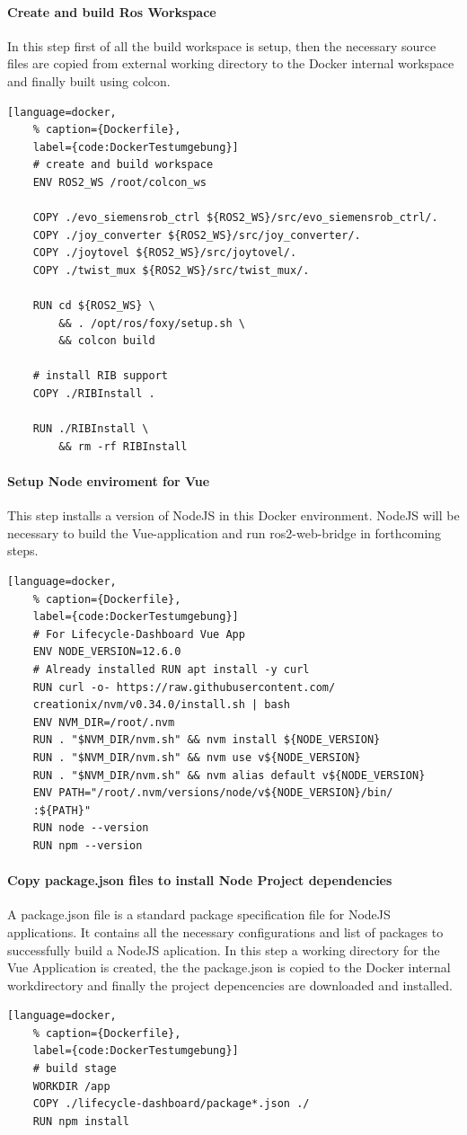\paragraph*{Create and build Ros Workspace} In this step first of all the build workspace is setup, then the necessary source files are copied from external working directory to the Docker internal workspace and finally built using colcon.
\begin{lstlisting}[language=docker,
	% caption={Dockerfile}, 
	label={code:DockerTestumgebung}]
	# create and build workspace
	ENV ROS2_WS /root/colcon_ws
		
	COPY ./evo_siemensrob_ctrl ${ROS2_WS}/src/evo_siemensrob_ctrl/.
	COPY ./joy_converter ${ROS2_WS}/src/joy_converter/.
	COPY ./joytovel ${ROS2_WS}/src/joytovel/.
	COPY ./twist_mux ${ROS2_WS}/src/twist_mux/.

	RUN cd ${ROS2_WS} \
		&& . /opt/ros/foxy/setup.sh \
		&& colcon build
		
	# install RIB support
	COPY ./RIBInstall .

	RUN ./RIBInstall \
		&& rm -rf RIBInstall
\end{lstlisting}

\paragraph{Setup Node enviroment for Vue} This step installs a version of NodeJS in this Docker environment. NodeJS will be necessary to build the Vue-application and run ros2-web-bridge in forthcoming steps. 
\begin{lstlisting}[language=docker,
	% caption={Dockerfile}, 
	label={code:DockerTestumgebung}]
	# For Lifecycle-Dashboard Vue App
	ENV NODE_VERSION=12.6.0
	# Already installed RUN apt install -y curl
	RUN curl -o- https://raw.githubusercontent.com/
	creationix/nvm/v0.34.0/install.sh | bash
	ENV NVM_DIR=/root/.nvm
	RUN . "$NVM_DIR/nvm.sh" && nvm install ${NODE_VERSION}
	RUN . "$NVM_DIR/nvm.sh" && nvm use v${NODE_VERSION}
	RUN . "$NVM_DIR/nvm.sh" && nvm alias default v${NODE_VERSION}
	ENV PATH="/root/.nvm/versions/node/v${NODE_VERSION}/bin/
	:${PATH}"
	RUN node --version
	RUN npm --version
\end{lstlisting}



\paragraph{Copy package.json files to install Node Project dependencies} A package.json file is a standard package specification file for NodeJS applications. It contains all the necessary configurations and list of packages to successfully build a NodeJS aplication. In this step 
a working directory for the Vue Application is created, the the package.json is copied to the Docker internal workdirectory and finally the project depencencies are downloaded and installed.
\begin{lstlisting}[language=docker,
	% caption={Dockerfile}, 
	label={code:DockerTestumgebung}]
	# build stage
	WORKDIR /app
	COPY ./lifecycle-dashboard/package*.json ./
	RUN npm install
\end{lstlisting}

